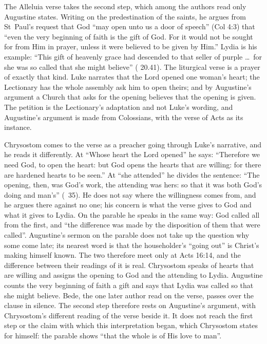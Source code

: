 The Alleluia verse takes the second step, which among the authors read only
Augustine states. Writing on the predestination of the saints, he argues from
St~Paul's request that God ``may open unto us a door of speech'' (Col 4:3) that ``even
the very beginning of faith is the gift of God. For it would not be sought
for from Him in prayer, unless it were believed to be given by Him.'' Lydia is
his example: ``This gift of heavenly grace had descended to that seller of
purple \ldots\ for she was so called that she might believe'' ( 20.41). The liturgical verse is a prayer of
exactly that kind. Luke narrates that the Lord opened one woman's heart; the
Lectionary has the whole assembly ask him to open theirs; and by Augustine's
argument a Church that asks for the opening believes that the opening is
given. The petition is the Lectionary's adaptation and not Luke's wording, and
Augustine's argument is made from Colossians, with the verse of Acts as its
instance.

Chrysostom comes to the verse as a preacher going through Luke's narrative,
and he reads it differently. At ``Whose heart the Lord opened'' he says:
``Therefore we need God, to open the heart: but God opens the hearts that are
willing: for there are hardened hearts to be seen.'' At ``she attended'' he
divides the sentence: ``The opening, then, was God's work, the attending was
hers: so that it was both God's doing and man's'' (~35). He does not say where the willingness comes from, and he argues
there against no one; his concern is what the verse gives to God and what it
gives to Lydia. On the parable he speaks in the same way: God called all from
the first, and ``the difference was made by the disposition of them that were
called''. Augustine's sermon on the parable does not take up the question why
some come late; its nearest word is that the householder's ``going out'' is
Christ's making himself known. The two therefore meet only at Acts 16:14, and
the difference between their readings of it is real. Chrysostom speaks of
hearts that are willing and assigns the opening to God and the attending to
Lydia. Augustine counts the very beginning of faith a gift and says that Lydia
was called so that she might believe. Bede, the one later author read on the
verse, passes over the clause in silence. The second step therefore rests on
Augustine's argument, with Chrysostom's different reading of the verse
beside it. It does not reach the first step or the claim with which
this interpretation began, which Chrysostom states for himself: the parable
shows ``that the whole is of His love to man''.


